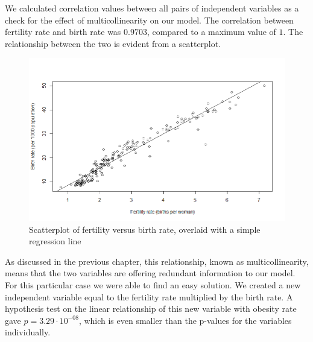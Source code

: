 \documentclass[oneside,12pt]{report}
\begin{document}
We calculated correlation values between all pairs of independent variables as a check for the effect of multicollinearity on our model. The correlation between fertility rate and birth rate was \begin{math}0.9703\end{math}, compared to a maximum value of \begin{math}1\end{math}. The relationship between the two is evident from a scatterplot. 

\begin{figure}
\centering
\label{fig:fertility-birth_rate}
\includegraphics[width=\textwidth]{fertility-birth_rate.png}
\caption[Scatterplot of the relationship between two independent variables]{Scatterplot of fertility versus birth rate, overlaid with a simple regression line}
\end{figure}

As discussed in the previous chapter, this relationship, known as multicollinearity, means that the two variables are offering redundant information to our model. For this particular case we were able to find an easy solution. We created a new independent variable equal to the fertility rate multiplied by the birth rate. A hypothesis test on the linear relationship of this new variable with obesity rate gave \begin{math}p=3.29\cdot10^{-08}\end{math}, which is even smaller than the p-values for the variables individually.
\end{document}
